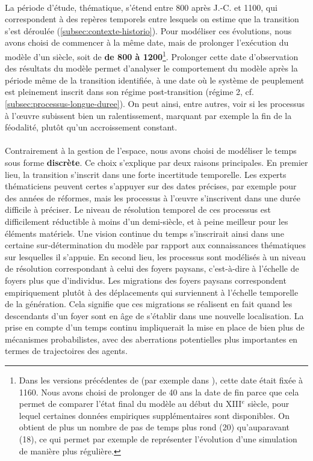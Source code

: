\paragraph[Durée]{} La période d'étude, thématique, s'étend entre 800 après J.-C. et 1100, qui correspondent à des repères temporels entre lesquels on estime que la transition s'est déroulée (\cref{subsec:contexte-historio}).
Pour modéliser ces évolutions, nous avons choisi de commencer à la même date, mais de prolonger l'exécution du modèle d'un siècle, soit de \textbf{de 800 à 1200}\footnote{
	Dans les versions précédentes de \simfeodal{} (par exemple dans \textcite{cura_transition_2017}), cette date était fixée à 1160.
	Nous avons choisi de prolonger de 40 ans la date de fin parce que cela 
	permet de comparer l'état final du modèle au début du XIII$^e$ siècle, pour lequel certaines données empiriques supplémentaires sont disponibles.
	On obtient de plus un nombre de pas de temps plus \og rond\fg{} (20) qu'auparavant (18), ce qui permet par exemple de représenter l'évolution d'une simulation de manière plus régulière.
}.
Prolonger cette date d'observation des résultats du modèle permet d'analyser le comportement du modèle après la période même de la transition identifiée, à une date où le système de peuplement est pleinement inscrit dans son régime post-transition (régime 2, cf. \cref{subsec:processus-longue-duree}).
On peut ainsi, entre autres, voir si les processus à l'œuvre subissent bien un ralentissement, marquant par exemple la fin de la féodalité, plutôt qu'un accroissement constant.

\paragraph[Discret]{} Contrairement à la gestion de l'espace, nous avons choisi de modéliser le temps sous forme \textbf{discrète}.
Ce choix s'explique par deux raisons principales.
En premier lieu, la transition s'inscrit dans une forte incertitude temporelle. 
Les experts thématiciens peuvent certes s'appuyer sur des dates précises, par exemple pour des années de réformes, mais les processus à l'œuvre s'inscrivent dans une durée difficile à préciser.
Le niveau de résolution temporel de ces processus est difficilement réductible à moins d'un demi-siècle, et à peine meilleur pour les éléments matériels.
Une vision continue du temps s'inscrirait ainsi dans une certaine sur-détermination du modèle par rapport aux connaissances thématiques sur lesquelles il s'appuie.
En second lieu, les processus sont modélisés à un niveau de résolution correspondant à celui des \og foyers paysans\fg{}, c'est-à-dire à l'échelle de foyers plus que d'individus.
Les migrations des foyers paysans correspondent empiriquement plutôt à des déplacements qui surviennent à l'échelle temporelle de la génération.
Cela signifie que ces migrations se réalisent en fait quand les descendants d'un foyer sont en âge de s'établir dans une nouvelle localisation.
La prise en compte d'un temps continu impliquerait la mise en place de bien plus de mécanismes probabilistes, avec des aberrations potentielles plus importantes en termes de trajectoires des agents.

